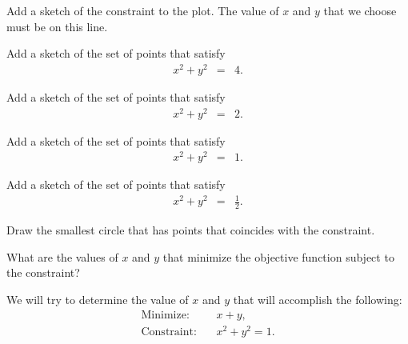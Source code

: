 \begin{problem}
  \begin{subproblem}
    \item Add a sketch of the constraint to the plot. The value of $x$
      and $y$ that we choose must be on this line.
    \item Add a sketch of the set of points that satisfy
      \begin{eqnarray*}
        x^2 + y^2 & = & 4.
      \end{eqnarray*}
    \item Add a sketch of the set of points that satisfy
      \begin{eqnarray*}
        x^2 + y^2 & = & 2.
      \end{eqnarray*}
    \item Add a sketch of the set of points that satisfy
      \begin{eqnarray*}
        x^2 + y^2 & = & 1.
      \end{eqnarray*}
    \item Add a sketch of the set of points that satisfy
      \begin{eqnarray*}
        x^2 + y^2 & = & \frac{1}{2}.
      \end{eqnarray*}
    \item Draw the smallest circle that has points that coincides with
      the constraint.
    \item What are the values of $x$ and $y$ that minimize the
      objective function subject to the constraint?
  \end{subproblem}

  \clearpage

\item We will try to determine the value of $x$ and $y$ that will
  accomplish the following:
  \begin{eqnarray*}
    \mathrm{Minimize:} & & x + y, \\
    \mathrm{Constraint:} & & x^2 + y^2 = 1.
  \end{eqnarray*}
  \label{optimizationMin}

  \vspace{-1em}
  \scalebox{0.55}{}


\end{problem}
